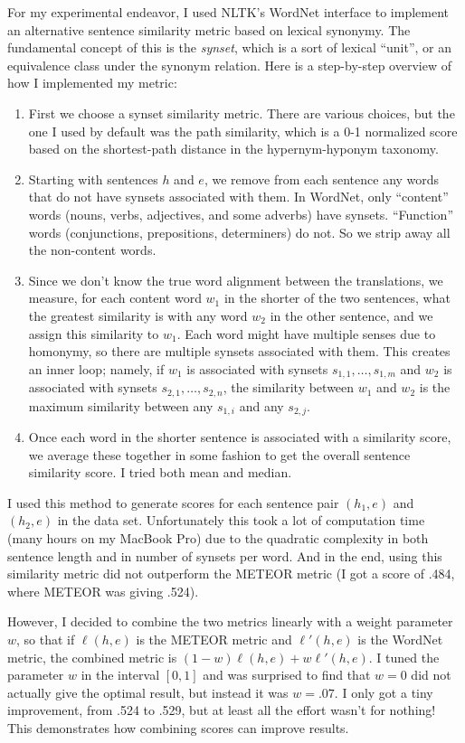 \documentclass[11pt, oneside]{article}      %
\begin{document}
For my experimental endeavor, I used NLTK's WordNet interface to implement an alternative sentence similarity metric based on lexical synonymy.  The fundamental concept of this is the \textit{synset}, which is a sort of lexical ``unit'', or an equivalence class under the synonym relation.  Here is a step-by-step overview of how I implemented my metric:
\begin{enumerate}
\item First we choose a synset similarity metric.  There are various choices, but the one I used by default was the path similarity, which is a 0-1 normalized score based on the shortest-path distance in the hypernym-hyponym taxonomy.
\item Starting with sentences $h$ and $e$, we remove from each sentence any words that do not have synsets associated with them.  In WordNet, only ``content'' words (nouns, verbs, adjectives, and some adverbs) have synsets.  ``Function'' words (conjunctions, prepositions, determiners) do not.  So we strip away all the non-content words.
\item Since we don't know the true word alignment between the translations, we measure, for each content word $w_1$ in the shorter of the two sentences, what the greatest similarity is with any word $w_2$ in the other sentence, and we assign this similarity to $w_1$.  Each word might have multiple senses due to homonymy, so there are multiple synsets associated with them.  This creates an inner loop; namely, if $w_1$ is associated with synsets $s_{1,1}, \dots, s_{1,m}$ and $w_2$ is associated with synsets $s_{2,1}, \dots, s_{2,n}$, the similarity between $w_1$ and $w_2$ is the maximum similarity between any $s_{1,i}$ and any $s_{2,j}$.
\item Once each word in the shorter sentence is associated with a similarity score, we average these together in some fashion to get the overall sentence similarity score.  I tried both mean and median.
\end{enumerate}

I used this method to generate scores for each sentence pair $(h_1, e)$ and $(h_2, e)$ in the data set.  Unfortunately this took a lot of computation time (many hours on my MacBook Pro) due to the quadratic complexity in both sentence length and in number of synsets per word.  And in the end, using this similarity metric did not outperform the METEOR metric (I got a score of .484, where METEOR was giving .524).  

However, I decided to combine the two metrics linearly with a weight parameter $w$, so that if $\ell(h, e)$ is the METEOR metric and $\ell'(h, e)$ is the WordNet metric, the combined metric is $(1 - w)\ell(h, e) + w \ell'(h, e)$.  I tuned the parameter $w$ in the interval $[0, 1]$ and was surprised to find that $w = 0$ did not actually give the optimal result, but instead it was $w = .07$.  I only got a tiny improvement, from .524 to .529, but at least all the effort wasn't for nothing!  This demonstrates how combining scores can improve results.
\end{document}
